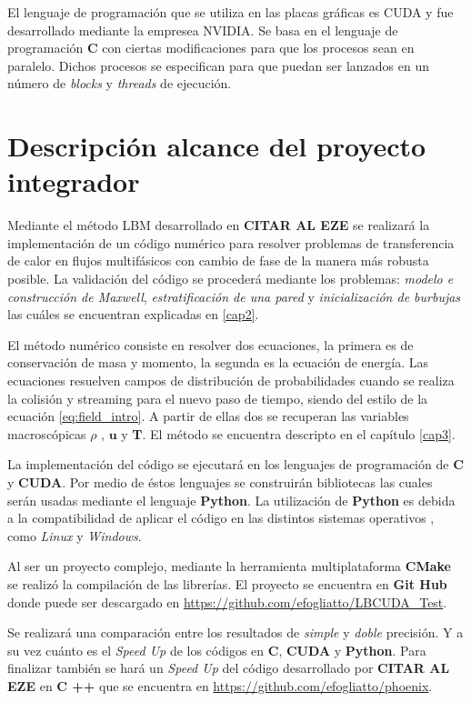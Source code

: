 El lenguaje de programación que se utiliza en las placas gráficas es CUDA y fue desarrollado mediante la empresea NVIDIA. Se basa en el lenguaje de programación \textbf{C} con ciertas modificaciones para que los procesos sean en paralelo. Dichos procesos se especifican para que puedan ser lanzados en un número de \textit{blocks} y \textit{threads} de ejecución.






\section{Descripción alcance del proyecto integrador}

Mediante el método LBM desarrollado en \textbf{CITAR AL EZE}	se realizará la implementación de un código numérico para resolver problemas de transferencia de calor en flujos multifásicos con cambio de fase de la manera más robusta posible.
La validación del código se procederá mediante los problemas: \textit{modelo e construcción de Maxwell}, \textit{estratificación de una pared} y \textit{inicialización de burbujas} las cuáles se encuentran explicadas en \ref{cap2}.

El método numérico consiste en resolver dos ecuaciones, la primera es de conservación de masa y momento, la segunda es la ecuación de energía. Las ecuaciones resuelven campos de distribución de probabilidades cuando se realiza la colisión y streaming para el nuevo paso de tiempo, siendo del estilo de la ecuación \ref{eq:field_intro}. A partir de ellas dos se recuperan las variables macroscópicas $\rho$ , $\mathbf{u}$ y \textbf{T}. El método se encuentra descripto en el capítulo \ref{cap3}.

La implementación del código se ejecutará en los lenguajes de programación de \textbf{C} y \textbf{CUDA}. Por medio de éstos lenguajes se construirán bibliotecas las cuales serán usadas mediante el lenguaje \textbf{Python}. La utilización de \textbf{Python} es debida a la compatibilidad de aplicar  el código en las distintos sistemas operativos , como \textit{Linux} y \textit{Windows}.

Al ser un proyecto complejo, mediante la herramienta multiplataforma \textbf{CMake} se realizó la compilación de las librerías. El proyecto se encuentra en \textbf{Git Hub} donde puede ser descargado en \url{ https://github.com/efogliatto/LBCUDA_Test}.

Se realizará una comparación entre los resultados de \textit{simple} y \textit{doble} precisión. Y a su vez cuánto es el \textit{Speed Up} de los códigos en \textbf{C}, \textbf{CUDA} y \textbf{Python}. Para finalizar también  se hará un \textit{Speed Up} del código desarrollado por \textbf{CITAR AL EZE} en \textbf{C ++} que se encuentra en \url{https://github.com/efogliatto/phoenix}.



